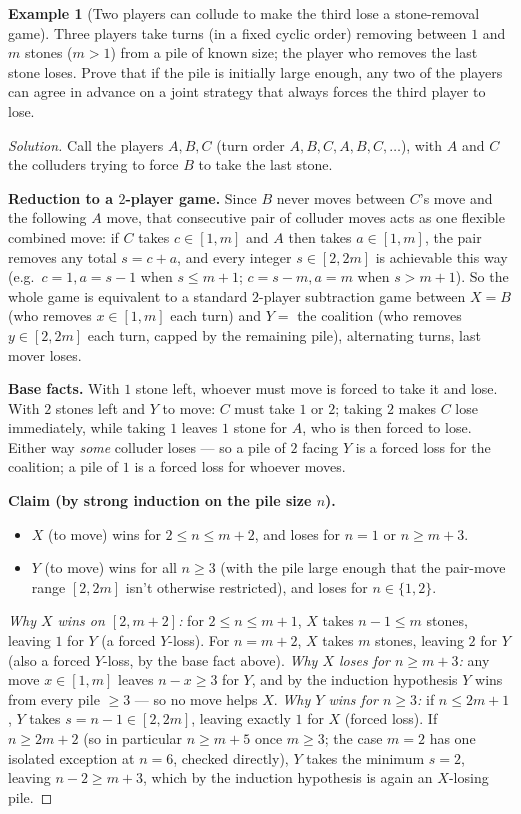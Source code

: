 \documentclass[11pt]{article}
\theoremstyle{definition}
\newtheorem{example}{Example}[section]
\begin{document}
\begin{example}[Two players can collude to make the third lose a stone-removal game]
Three players take turns (in a fixed cyclic order) removing between $1$ and $m$ stones ($m>1$) from a pile of known size; the player who removes the last stone loses. Prove that if the pile is initially large enough, any two of the players can agree in advance on a joint strategy that always forces the third player to lose.
\end{example}
\begin{proof}[Solution]
Call the players $A,B,C$ (turn order $A,B,C,A,B,C,\dots$), with $A$ and $C$ the colluders trying to force $B$ to take the last stone.

\textbf{Reduction to a $2$-player game.} Since $B$ never moves between $C$'s move and the following $A$ move, that consecutive pair of colluder moves acts as one flexible combined move: if $C$ takes $c\in[1,m]$ and $A$ then takes $a\in[1,m]$, the pair removes any total $s=c+a$, and every integer $s\in[2,2m]$ is achievable this way (e.g.\ $c=1,a=s-1$ when $s\le m+1$; $c=s-m,a=m$ when $s>m+1$). So the whole game is equivalent to a standard $2$-player subtraction game between $X=B$ (who removes $x\in[1,m]$ each turn) and $Y=$ the coalition (who removes $y\in[2,2m]$ each turn, capped by the remaining pile), alternating turns, last mover loses.

\textbf{Base facts.} With $1$ stone left, whoever must move is forced to take it and lose. With $2$ stones left and $Y$ to move: $C$ must take $1$ or $2$; taking $2$ makes $C$ lose immediately, while taking $1$ leaves $1$ stone for $A$, who is then forced to lose. Either way \emph{some} colluder loses — so a pile of $2$ facing $Y$ is a forced loss for the coalition; a pile of $1$ is a forced loss for whoever moves.

\textbf{Claim (by strong induction on the pile size $n$).}
\begin{itemize}
\item $X$ (to move) wins for $2\le n\le m+2$, and loses for $n=1$ or $n\ge m+3$.
\item $Y$ (to move) wins for all $n\ge3$ (with the pile large enough that the pair-move range $[2,2m]$ isn't otherwise restricted), and loses for $n\in\{1,2\}$.
\end{itemize}
\emph{Why $X$ wins on $[2,m+2]$:} for $2\le n\le m+1$, $X$ takes $n-1\le m$ stones, leaving $1$ for $Y$ (a forced $Y$-loss). For $n=m+2$, $X$ takes $m$ stones, leaving $2$ for $Y$ (also a forced $Y$-loss, by the base fact above). \emph{Why $X$ loses for $n\ge m+3$:} any move $x\in[1,m]$ leaves $n-x\ge3$ for $Y$, and by the induction hypothesis $Y$ wins from every pile $\ge3$ — so no move helps $X$. \emph{Why $Y$ wins for $n\ge3$:} if $n\le2m+1$, $Y$ takes $s=n-1\in[2,2m]$, leaving exactly $1$ for $X$ (forced loss). If $n\ge2m+2$ (so in particular $n\ge m+5$ once $m\ge3$; the case $m=2$ has one isolated exception at $n=6$, checked directly), $Y$ takes the minimum $s=2$, leaving $n-2\ge m+3$, which by the induction hypothesis is again an $X$-losing pile.


\end{proof}
\end{document}
